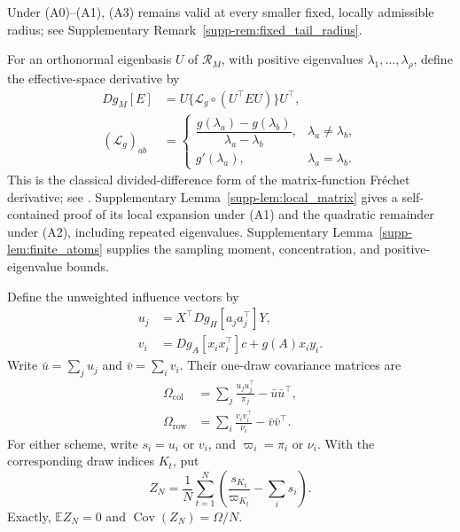 \documentclass[pdflatex,iicol,sn-mathphys-ay]{sn-jnl}
\theoremstyle{thmstyleone}
\theoremstyle{thmstylethree}
\theoremstyle{thmstyletwo}
\newcommand{\E}{\mathbb E}
\begin{document}
Under (A0)--(A1), (A3) remains valid at every smaller fixed, locally
admissible radius; see Supplementary Remark~\ref{supp-rem:fixed_tail_radius}.

For an orthonormal eigenbasis $U$ of $\mathcal R_M$, with positive
eigenvalues $\lambda_1,\ldots,\lambda_\rho$, define the effective-space derivative by
\[
 \begin{aligned}
 Dg_M[E]&=U\{\mathcal L_g\circ(U^\top EU)\}U^\top,\\
 (\mathcal L_g)_{ab}&=
 \begin{cases}
 \dfrac{g(\lambda_a)-g(\lambda_b)}{\lambda_a-\lambda_b},&\lambda_a\ne\lambda_b,\\[3pt]
 g'(\lambda_a),&\lambda_a=\lambda_b.
 \end{cases}
 \end{aligned}
\]
This is the classical divided-difference form of the matrix-function
Fr\'echet derivative; see \citet[Chapter~3]{higham2008functions}.
Supplementary Lemma~\ref{supp-lem:local_matrix} gives a self-contained proof of its local expansion
under (A1) and the quadratic remainder under (A2), including repeated
eigenvalues. Supplementary Lemma~\ref{supp-lem:finite_atoms} supplies the
sampling moment, concentration, and positive-eigenvalue bounds.



Define the unweighted influence vectors by
\begin{align*}
 u_j&=X^\top Dg_H[a_ja_j^\top]Y,\\
 v_i&=Dg_A[x_ix_i^\top]c+g(A)x_iy_i.
\end{align*}
Write $\bar u=\sum_j u_j$ and $\bar v=\sum_i v_i$.
Their one-draw covariance matrices are
\begin{align*}
 \Omega_{\mathrm{col}}&=\sum_j\frac{u_ju_j^\top}{\pi_j}-\bar u\bar u^\top,
 \\
 \Omega_{\mathrm{row}}&=\sum_i\frac{v_iv_i^\top}{\nu_i}-\bar v\bar v^\top.
\end{align*}
For either scheme, write $s_i=u_i$ or $v_i$, and $\varpi_i=\pi_i$ or $\nu_i$.
With the corresponding draw indices $K_t$, put
\[
 Z_N=\frac1N\sum_{t=1}^N
       \left(\frac{s_{K_t}}{\varpi_{K_t}}-\sum_i s_i\right).
\]
Exactly, $\E Z_N=0$ and $\operatorname{Cov}(Z_N)=\Omega/N$.
\end{document}
